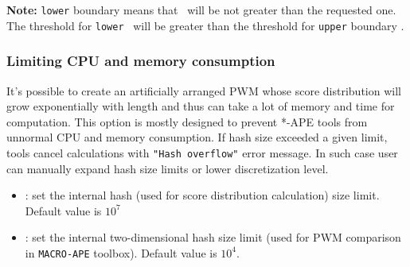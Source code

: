 \textbf{Note:} \texttt{lower} boundary means that \pvalue\ will be not greater than the requested one.
The threshold for \texttt{lower} \pvalue\ will be greater than the threshold for \texttt{upper} boundary \pvalue.


\subsubsection{Limiting CPU and memory consumption}
It's possible to create an artificially arranged PWM whose score distribution
 will grow exponentially with length and thus can take a lot of memory and time for computation.
 This option is mostly designed to prevent *-APE tools from unnormal CPU and memory consumption.
 If hash size exceeded a given limit, tools cancel calculations with \texttt{"Hash overflow"} error message.
 In such case user can manually expand hash size limits or lower discretization level.
  \begin{itemize}
  \item {}: set the internal hash (used for score distribution calculation) size limit. Default value is $10^7$
  \item {}: set the internal two-dimensional hash size limit (used for PWM comparison in \texttt{MACRO-APE} toolbox). Default value is $10^4$.
  \end{itemize}
